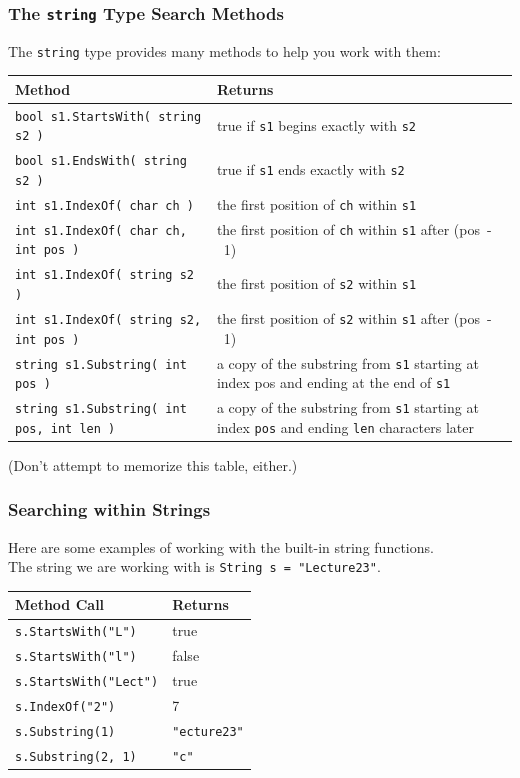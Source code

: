 \begin{frame}
\frametitle{The \texttt{string} Type Search Methods}
The \texttt{string} type provides many methods to help you work with them:

{\scriptsize
\begin{center}
\begin{tabular}{l|p{5cm}}
	\textbf{Method} & \textbf{Returns} \\ \hline
	
\texttt{bool s1.StartsWith( string s2 )} & true if \texttt{s1} begins exactly with \texttt{s2}\\ \hline
\texttt{bool s1.EndsWith( string s2 )} & true if \texttt{s1} ends exactly with \texttt{s2}\\ \hline
\texttt{int s1.IndexOf( char ch )} & the first position of \texttt{ch} within \texttt{s1}\\ \hline
\texttt{int s1.IndexOf( char ch, int pos )} & the first position of \texttt{ch} within \texttt{s1} after (pos~-~1)\\ \hline
\texttt{int s1.IndexOf( string s2 )} & the first position of \texttt{s2} within \texttt{s1}\\ \hline
\texttt{int s1.IndexOf( string s2, int pos )} & the first position of \texttt{s2} within \texttt{s1} after (pos~-~1)\\ \hline
\texttt{string s1.Substring( int pos )} & a copy of the substring from \texttt{s1} starting at index pos and ending at the end of \texttt{s1}\\ \hline
\texttt{string s1.Substring( int pos, int len )} & a copy of the substring from \texttt{s1} starting at index \texttt{pos} and ending \texttt{len} characters later\\ 
\end{tabular}
\end{center}
}

(Don't attempt to memorize this table, either.)

\end{frame}


\begin{frame}
\frametitle{Searching within Strings}
Here are some examples of working with the built-in string functions.\\
\quad The string we are working with is \texttt{String s = "Lecture23"}.

\begin{center}
\begin{tabular}{l|l}
	\textbf{Method Call} & \textbf{Returns} \\ \hline
	\texttt{s.StartsWith("L")} & true\\
	\texttt{s.StartsWith("l")} & false\\
	\texttt{s.StartsWith("Lect")} & true\\
	\texttt{s.IndexOf("2")} & 7\\
	\texttt{s.Substring(1)} & \texttt{"ecture23"}\\
	\texttt{s.Substring(2, 1)} & \texttt{"c"}\\
\end{tabular}
\end{center}

\end{frame}

